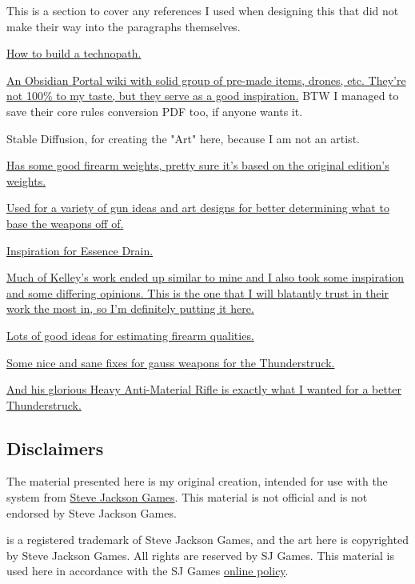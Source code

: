 \begin{multicols*}{2}
	This is a section to cover any references I used when designing this that did not make their way into the paragraphs themselves.
	
	\href{https://www.ravensnpennies.com/gurps101-how-to-build-a-technopath/}{How to build a technopath.}
	
	\href{https://gurps-sr.obsidianportal.com}{An Obsidian Portal wiki with solid group of pre-made items, drones, etc. They're not 100\% to my taste, but they serve as a good inspiration.} BTW I managed to save their core rules conversion PDF too, if anyone wants it.
	
	Stable Diffusion, for creating the "Art" here, because I am not an artist.
	
	\href{http://www.ci-n.com/~jcampbel/rpgs/shadowrun/weapons.php?altskills}{Has some good firearm weights, pretty sure it's based on the original edition's weights.}
	
	\href{http://www.ambient.ca/cpunk/shadowguns/subguns.html}{Used for a variety of gun ideas and art designs for better determining what to base the weapons off of.}
	
	\href{http://forums.sjgames.com/showthread.php?t=152300}{Inspiration for Essence Drain.}
	
	\href{http://forums.sjgames.com/showpost.php?p=507199&postcount=8}{Much of Kelley's work ended up similar to mine and I also took some inspiration and some differing opinions. This is the one that I will blatantly trust in their work the most in, so I'm definitely putting it here.}
	
	\href{http://gurb3d6.blogspot.com/2017/01/ultra-tech-quickie-more-blaster-and.html}{Lots of good ideas for estimating firearm qualities.}
	
	\href{http://gurb3d6.blogspot.com/2017/05/gauss-weapons-reloaded.html}{Some nice and sane fixes for gauss weapons for the Thunderstruck.}
	
	\href{http://gurb3d6.blogspot.com/2016/09/have-gauss-will-travel.html}{And his glorious Heavy Anti-Material Rifle is exactly what I wanted for a better Thunderstruck.}
	
	\subsection{Disclaimers}
	
	The material presented here is my original creation, intended for use with the \href{http://www.sjgames.com/gurps/}{\GURPS} system from \href{http://www.sjgames.com/}{Steve Jackson Games}. This material is not official and is not endorsed by Steve Jackson Games.
	
	\href{http://www.sjgames.com/gurps/}{\GURPS} is a registered trademark of Steve Jackson Games, and the art here is copyrighted by Steve Jackson Games. All rights are reserved by SJ Games. This material is used here in accordance with the SJ Games \href{http://www.sjgames.com/general/online_policy.html}{online policy}.
	
\end{multicols*}